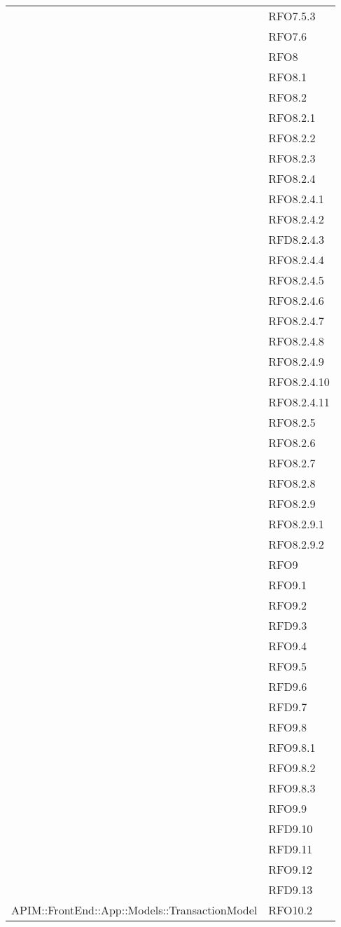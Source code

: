 \begin{longtable}{ p{12cm} | p{4cm} }
			& RFO7.5.3 \\
			& RFO7.6 \\
			& RFO8 \\
			& RFO8.1 \\
			& RFO8.2 \\
			& RFO8.2.1 \\
			& RFO8.2.2 \\
			& RFO8.2.3 \\
			& RFO8.2.4 \\
			& RFO8.2.4.1 \\
			& RFO8.2.4.2 \\
			& RFD8.2.4.3 \\
			& RFO8.2.4.4 \\
			& RFO8.2.4.5 \\
			& RFO8.2.4.6 \\
			& RFO8.2.4.7 \\
			& RFO8.2.4.8 \\
			& RFO8.2.4.9 \\
			& RFO8.2.4.10 \\
			& RFO8.2.4.11 \\
			& RFO8.2.5 \\
			& RFO8.2.6 \\
			& RFO8.2.7 \\
			& RFO8.2.8 \\
			& RFO8.2.9 \\
			& RFO8.2.9.1 \\
			& RFO8.2.9.2 \\
			& RFO9 \\
			& RFO9.1 \\
			& RFO9.2 \\
			& RFD9.3 \\
			& RFO9.4 \\
			& RFO9.5 \\
			& RFD9.6 \\
			& RFD9.7 \\
			& RFO9.8 \\
			& RFO9.8.1 \\
			& RFO9.8.2 \\
			& RFO9.8.3 \\
			& RFO9.9 \\
			& RFD9.10 \\
			& RFD9.11 \\
			& RFO9.12 \\
			& RFD9.13 \\
			\hline
			APIM::FrontEnd::App::Models::TransactionModel
			& RFO10.2 \\

\end{longtable}
